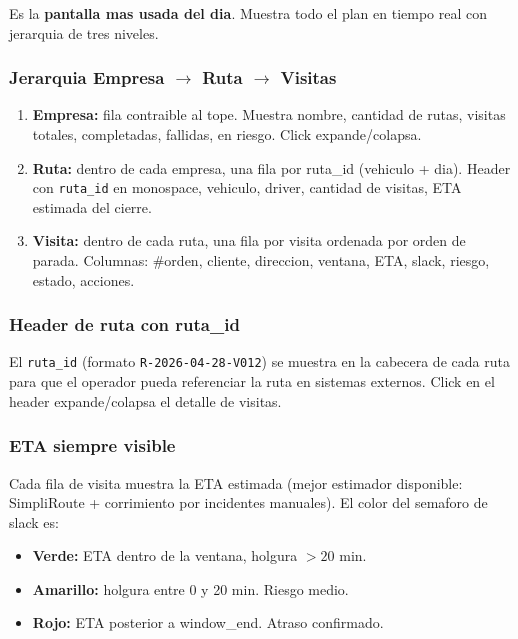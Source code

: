 \documentclass[11pt,a4paper]{article}
\begin{document}
Es la \textbf{pantalla mas usada del dia}. Muestra todo el plan en
tiempo real con jerarquia de tres niveles.

\subsubsection{Jerarquia Empresa $\rightarrow$ Ruta $\rightarrow$ Visitas}

\begin{enumerate}
  \item \textbf{Empresa:} fila contraible al tope. Muestra nombre,
        cantidad de rutas, visitas totales, completadas, fallidas, en
        riesgo. Click expande/colapsa.
  \item \textbf{Ruta:} dentro de cada empresa, una fila por
        ruta\_id (vehiculo + dia). Header con
        \texttt{ruta\_id} en monospace, vehiculo, driver, cantidad de
        visitas, ETA estimada del cierre.
  \item \textbf{Visita:} dentro de cada ruta, una fila por visita
        ordenada por orden de parada. Columnas: \#orden, cliente,
        direccion, ventana, ETA, slack, riesgo, estado, acciones.
\end{enumerate}

\subsubsection{Header de ruta con ruta\_id}

El \texttt{ruta\_id} (formato \texttt{R-2026-04-28-V012}) se muestra
en la cabecera de cada ruta para que el operador pueda referenciar la
ruta en sistemas externos. Click en el header expande/colapsa el
detalle de visitas.

\subsubsection{ETA siempre visible}

Cada fila de visita muestra la ETA estimada (mejor estimador
disponible: SimpliRoute + corrimiento por incidentes manuales). El
color del semaforo de slack es:

\begin{itemize}
  \item \textbf{Verde:} ETA dentro de la ventana, holgura $> 20$ min.
  \item \textbf{Amarillo:} holgura entre 0 y 20 min. Riesgo medio.
  \item \textbf{Rojo:} ETA posterior a window\_end. Atraso confirmado.
\end{itemize}
\end{document}
